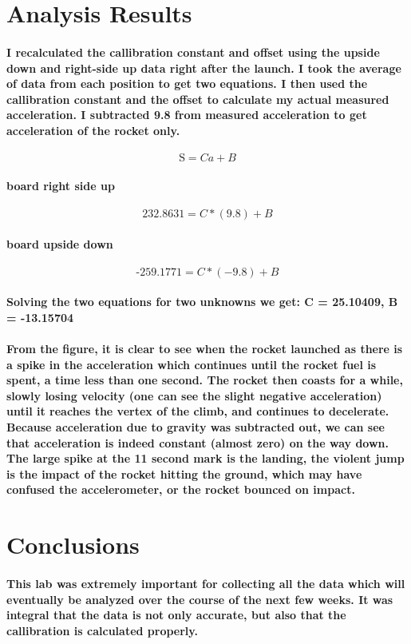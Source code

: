 \documentclass[a4paper,11pt]{article}
\begin{document}
\section{Analysis Results}
\paragraph{\quad I recalculated the callibration constant and offset using the upside down and right-side up data right after the launch. I took the average of data from each position to get two equations. I then used the callibration constant and the offset to calculate my actual measured acceleration. I subtracted 9.8 from measured acceleration to get acceleration of the rocket only.}

\begin{equation} 
\textrm{S} = Ca + B
\end{equation}

\paragraph{board right side up}
\begin{equation} 
\textrm{232.8631} = C*(9.8) + B
\end{equation} 

\paragraph{board upside down}
\begin{equation} 
\textrm{-259.1771} = C*(-9.8)+ B
\end{equation} 

\paragraph{Solving the two equations for two unknowns we get: C = 25.10409, B = -13.15704}
\paragraph{From the figure, it is clear to see when the rocket launched as there is a spike in the acceleration which continues until the rocket fuel is spent, a time less than one second. The rocket then coasts for a while, slowly losing velocity (one can see the slight negative acceleration) until it reaches the vertex of the climb, and continues to decelerate. Because acceleration due to gravity was subtracted out, we can see that acceleration is indeed constant (almost zero) on the way down. The large spike at the 11 second mark is the landing, the violent jump is the impact of the rocket hitting the ground, which may have confused the accelerometer, or the rocket bounced on impact. }

\section{Conclusions}
\paragraph{\quad This lab was extremely important for collecting all the data which will eventually be analyzed over the course of the next few weeks. It was integral that the data is not only accurate, but also that the callibration is calculated properly. }
\end{document}
